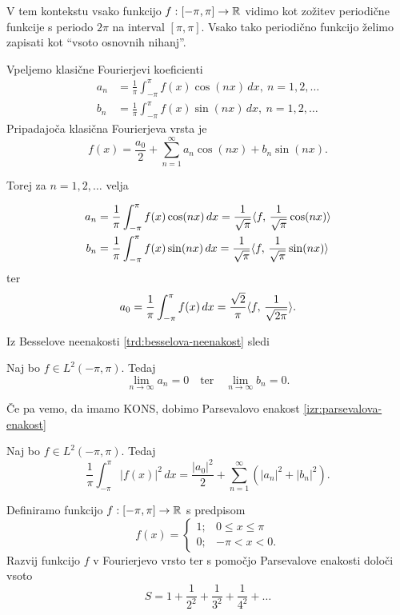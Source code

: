 \begin{opomba}
    V tem kontekstu vsako funkcijo \(f: [-\pi, \pi] \to \mathbb{R}\) vidimo kot zožitev periodične funkcije s periodo \(2\pi\) na interval \([\pi, \pi]\).
    Vsako tako periodično funkcijo želimo zapisati kot "`vsoto osnovnih nihanj"'.
\end{opomba}

Vpeljemo klasične Fourierjevi koeficienti
\begin{align*}
    a_n &= \frac{1}{\pi} \int_{-\pi}^{\pi} f(x) \cos (nx) \, dx, \ n = 1, 2, \ldots \\
    b_n &= \frac{1}{\pi} \int_{-\pi}^{\pi} f(x) \sin (nx) \, dx, \ n = 1, 2, \ldots
\end{align*}
Pripadajoča klasična Fourierjeva vrsta je 
\[
    f(x) = \frac{a_0}{2} + \sum_{n=1}^{\infty} a_n \cos(nx) + b_n \sin(nx).
\]

Torej za \(n = 1, 2, \ldots\) velja

\begin{align*}
    a_n &= \frac{1}{\pi} \int_{-\pi}^{\pi}f(x) \cos(nx) \, dx = \frac{1}{\sqrt{\pi}} \langle f, \, \frac{1}{\sqrt{\pi}} \cos(nx) \rangle \\
    b_n &= \frac{1}{\pi} \int_{-\pi}^{\pi}f(x) \sin(nx) \, dx = \frac{1}{\sqrt{\pi}} \langle f, \, \frac{1}{\sqrt{\pi}} \sin(nx) \rangle
\end{align*}
ter
\[
a_0 = \frac{1}{\pi} \int_{-\pi}^{\pi} f(x) \, dx = \frac{\sqrt{2}}{\pi} \langle f, \, \frac{1}{\sqrt{2\pi}} \rangle.
\]

Iz Besselove neenakosti \ref{trd:besselova-neenakost} sledi
\begin{trditev}
    Naj bo \(f \in L^2(-\pi, \pi)\). Tedaj 
    \[
        \lim_{n \to \infty} a_n = 0 \quad \text{ter} \quad \lim_{n \to \infty} b_n = 0.
    \]
\end{trditev}

Če pa vemo, da imamo KONS, dobimo Parsevalovo enakost \ref{izr:parsevalova-enakost}
\begin{trditev}
    Naj bo \(f \in L^2(-\pi, \pi)\). Tedaj 
    \[
        \frac{1}{\pi} \int_{-\pi}^{\pi}|f(x)|^2 \, dx = \frac{|a_0|^2}{2} + \sum_{n=1}^{\infty}(|a_n|^2+|b_n|^2).
    \]
\end{trditev}

\begin{zgled}
    Definiramo funkcijo \(f: [-\pi, \pi] \to \mathbb{R}\) s predpisom
    \[
        f(x) = \begin{cases}
            1; &0 \leq x \leq \pi \\
            0; &-\pi < x < 0.
        \end{cases}
    \]
    Razvij funkcijo \(f\) v Fourierjevo vrsto ter s pomočjo Parsevalove enakosti določi vsoto 
    \[
        S = 1 + \frac{1}{2^2} + \frac{1}{3^2} + \frac{1}{4^2} + \ldots
    \]
\end{zgled}

